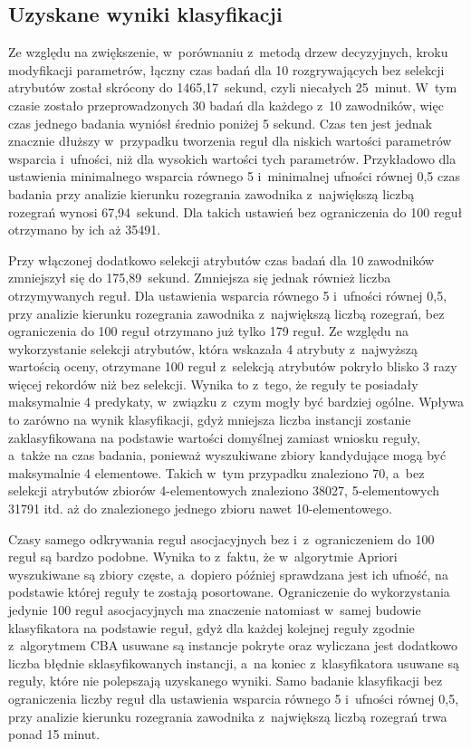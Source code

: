 \documentclass[a4paper,twoside,12pt]{book}
\begin{document}
\subsection{Uzyskane wyniki klasyfikacji}

Ze względu na zwiększenie, w~porównaniu z~metodą drzew decyzyjnych, kroku modyfikacji parametrów, łączny czas badań dla 10 rozgrywających bez selekcji atrybutów został skrócony do 1465,17~sekund, czyli niecałych 25~minut. W~tym czasie zostało przeprowadzonych 30 badań dla każdego z~10 zawodników, więc czas jednego badania wyniósł średnio poniżej 5 sekund. Czas ten jest jednak znacznie dłuższy w~przypadku tworzenia reguł dla niskich wartości parametrów wsparcia i~ufności, niż dla wysokich wartości tych parametrów. Przykładowo dla ustawienia minimalnego wsparcia równego 5 i~minimalnej ufności równej 0,5 czas badania przy analizie kierunku rozegrania zawodnika z~największą liczbą rozegrań wynosi 67,94~sekund. Dla takich ustawień bez ograniczenia do 100 reguł otrzymano by ich aż 35491.

Przy włączonej dodatkowo selekcji atrybutów czas badań dla 10 zawodników zmniejszył się do 175,89~sekund. Zmniejsza się jednak również liczba otrzymywanych reguł. Dla ustawienia wsparcia równego 5 i~ufności równej 0,5, przy analizie kierunku rozegrania zawodnika z~największą liczbą rozegrań, bez ograniczenia do 100 reguł otrzymano już tylko 179 reguł. Ze względu na wykorzystanie selekcji atrybutów, która wskazała 4 atrybuty z~najwyższą wartością oceny, otrzymane 100 reguł z~selekcją atrybutów pokryło blisko 3 razy więcej rekordów niż bez selekcji. Wynika to z~tego, że reguły te posiadały maksymalnie 4 predykaty, w~związku z~czym mogły być bardziej ogólne. Wpływa to zarówno na wynik klasyfikacji, gdyż mniejsza liczba instancji zostanie zaklasyfikowana na podstawie wartości domyślnej zamiast wniosku reguły, a~także na czas badania, ponieważ wyszukiwane zbiory kandydujące mogą być maksymalnie 4 elementowe. Takich w~tym przypadku znaleziono 70, a~bez selekcji atrybutów zbiorów 4-elementowych znaleziono 38027, 5-elementowych 31791 itd. aż do znalezionego jednego zbioru nawet 10-elementowego.

Czasy samego odkrywania reguł asocjacyjnych bez i~z~ograniczeniem do 100 reguł są bardzo podobne. Wynika to z~faktu, że w~algorytmie Apriori wyszukiwane są zbiory częste, a~dopiero później sprawdzana jest ich ufność, na podstawie której reguły te zostają posortowane. Ograniczenie do wykorzystania jedynie 100 reguł asocjacyjnych ma znaczenie natomiast w~samej budowie klasyfikatora na podstawie reguł, gdyż dla każdej kolejnej reguły zgodnie z~algorytmem CBA usuwane są instancje pokryte oraz wyliczana jest dodatkowo liczba błędnie sklasyfikowanych instancji, a~na koniec z~klasyfikatora usuwane są reguły, które nie polepszają uzyskanego wyniki. Samo badanie klasyfikacji bez ograniczenia liczby reguł dla ustawienia wsparcia równego 5 i~ufności równej 0,5, przy analizie kierunku rozegrania zawodnika z~największą liczbą rozegrań trwa ponad 15 minut.
\end{document}

